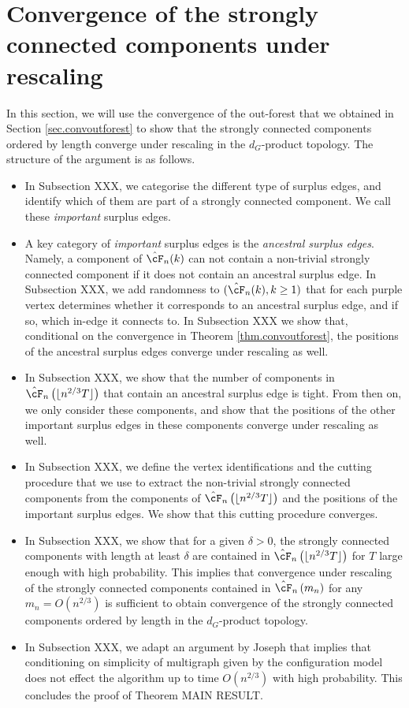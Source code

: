 \section{Convergence of the strongly connected components under rescaling}\label{sec.convSCCs}
In this section, we will use the convergence of the out-forest that we obtained in Section \ref{sec.convoutforest} to show that the strongly connected components ordered by length converge under rescaling in the $d_G$-product topology. The structure of the argument is as follows. 
\begin{itemize}
    \item In Subsection XXX, we categorise the different type of surplus edges, and identify which of them are part of a strongly connected component. We call these \emph{important} surplus edges.
    \item A key category of \emph{important} surplus edges is the \emph{ancestral surplus edges}. Namely, a component of $\hat{\cF}_n(k)$ can not contain a non-trivial strongly connected component if it does not contain an ancestral surplus edge. In Subsection XXX, we add randomness to $(\hat{\cF}_n(k),k\geq 1)$ that for each purple vertex determines whether it corresponds to an ancestral surplus edge, and if so, which in-edge it connects to. In Subsection XXX we show that, conditional on the convergence in Theorem \ref{thm.convoutforest}, the positions of the ancestral surplus edges converge under rescaling as well. 
    \item In Subsection XXX, we show that the number of components in $\hat{\cF}_n\left(\lfloor n^{2/3}T\rfloor \right)$ that contain an ancestral surplus edge is tight. From then on, we only consider these components, and show that the positions of the other important surplus edges in these components converge under rescaling as well. 
    \item In Subsection XXX, we define the vertex identifications and the cutting procedure that we use to extract the non-trivial strongly connected components from the components of $\hat{\cF}_n\left(\lfloor n^{2/3}T\rfloor \right)$ and the positions of the important surplus edges. We show that this cutting procedure converges.
    \item In Subsection XXX, we show that for a given $\delta>0$, the strongly connected components with length at least $\delta$ are contained in $\hat{\cF}_n\left(\lfloor n^{2/3}T\rfloor \right)$ for $T$ large enough with high probability. This implies that convergence under rescaling of the strongly connected components contained in $\hat{\cF}_n\left(m_n \right)$ for any $m_n=O(n^{2/3})$ is sufficient to obtain convergence of the strongly connected components ordered by length in the $d_G$-product topology. 
    \item In Subsection XXX, we adapt an argument by Joseph \cite{Joseph2014} that implies that conditioning on simplicity of multigraph given by the configuration model does not effect the algorithm up to time $O(n^{2/3})$ with high probability. This concludes the proof of Theorem MAIN RESULT. 
\end{itemize}

